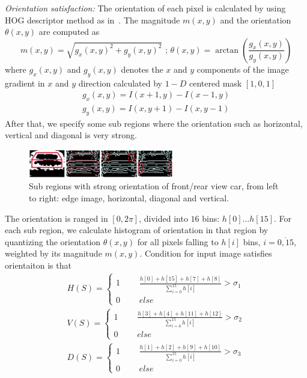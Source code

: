 \textit{Orientation satisfaction:}
The orientation of each pixel is calculated by using HOG descriptor method as in~\cite{bay2008surf}. The magnitude $m(x, y)$
and the orientation $\theta(x, y)$ are computed as
\begin{equation}
    m(x,y) = \sqrt{{g_x(x,y)}^2 + {g_y(x,y)}^2}
    \mbox{~;~}
    \theta(x,y) = \arctan(\frac{g_x(x,y)}{g_y(x,y)})
\end{equation}
where $g_x(x, y)$ and $g_y(x, y)$ denotes the $x$ and $y$ components of the
image gradient in $x$ and $y$ direction calculated by $1-D$ centered mask $[ 1, 0, 1]$
\begin{equation}
    \begin{array}{rcl}
    g_x(x,y) = I(x+1,y) - I(x-1,y) \\
    g_y(x,y) = I(x,y+1) - I(x,y-1)
    \end{array}
\end{equation}
After that, we specify some sub regions where the
orientation such as horizontal, vertical and diagonal is very strong.
\begin{figure}[ht]
  \centering
  \includegraphics[width=2.5in]{images/hog.jpg}
  \caption{Sub regions with strong orientation of front/rear view car, from left to
right: edge image, horizontal, diagonal and vertical.}
  \label{fig:hog}
\end{figure}
The orientation is ranged in $[0, 2\pi]$, divided into $16$ bins: $h[0]...
h[15]$. For each sub region, we calculate histogram of orientation in
that region by quantizing the orientation $\theta(x, y)$ for all pixels falling
to $h[i]$ bins, $i=\overline{0,15}$, weighted by its magnitude $m(x, y)$.
Condition for input image satisfies orientaiton is that
\begin{equation}
    \begin{array}{rcl}
   H(S) = \left\{ 
   \begin{array}{rcl}
   1 & \mbox{~~} & \frac{h[0] + h[15] + h[7] + h[8]}{\sum_{i=0}^{15}h[i]} > \sigma_1\\
   0 & \mbox{~~} & else
   \end{array}\right. \\
   V(S) = \left\{ 
   \begin{array}{rcl}
   1 & \mbox{~~} & \frac{h[3] + h[4] + h[11] + h[12]}{\sum_{i=0}^{15}h[i]} > \sigma_2\\
   0 & \mbox{~~} & else
   \end{array}\right. \\
   D(S) = \left\{ 
   \begin{array}{rcl}
   1 & \mbox{~~} & \frac{h[1] + h[2] + h[9] + h[10]}{\sum_{i=0}^{15}h[i]} > \sigma_3\\
   0 & \mbox{~~} & else
   \end{array}\right. 
    \end{array}
\end{equation}
